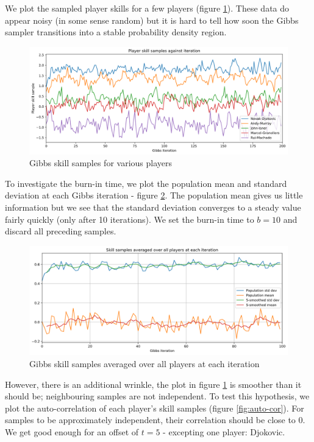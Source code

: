 \documentclass[]{article}
\begin{document}
We plot the sampled player skills for a few players (figure \ref{fig:skill-samples-long}). These data do appear noisy (in some sense random) but it is hard to tell how soon the Gibbs sampler transitions into a stable probability density region.

\begin{figure}[!h]
	\centering
	\includegraphics[width=0.8\linewidth]{skill-samples-long.png}
	\caption{Gibbs skill samples for various players}
	\label{fig:skill-samples-long}
\end{figure}

To investigate the burn-in time, we plot the population mean and standard deviation at each Gibbs iteration - figure \ref{fig:burn-in}. The population mean gives us little information but we see that the standard deviation converges to a steady value fairly quickly (only after 10 iterations). We set the burn-in time to $b=10$ and discard all preceding samples. 

\begin{figure}[!h]
	\centering
	\includegraphics[width=0.8\linewidth]{burn-in.png}
	\caption{Gibbs skill samples averaged over all players at each iteration}
	\label{fig:burn-in}
\end{figure}

However, there is an additional wrinkle, the plot in figure \ref{fig:skill-samples-long} is smoother than it should be; neighbouring samples are not independent. To test this hypothesis, we plot the auto-correlation of each player's skill samples (figure \ref{fig:auto-cor}). For samples to be approximately independent, their correlation should be close to 0. We get good enough for an offset of $t=5$ - excepting one player: Djokovic.
\end{document}
